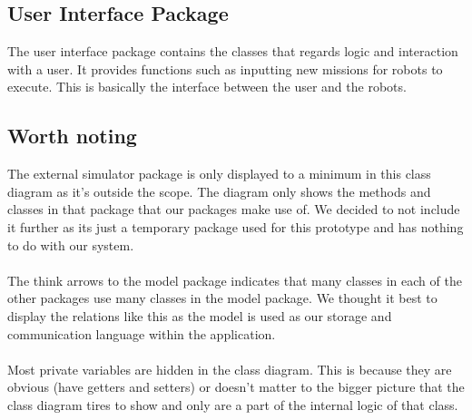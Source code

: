 \subsection{User Interface Package}
The user interface package contains the classes that regards logic and interaction with a user. It provides functions such as inputting new missions for robots to execute. This is basically the interface between the user and the robots.

\subsection{Worth noting}
The external simulator package is only displayed to a minimum in this class diagram as it's outside the scope. The diagram only shows the methods and classes in that package that our packages make use of. We decided to not include it further as its just a temporary package used for this prototype and has nothing to do with our system.
\\ \\
The think arrows to the model package indicates that many classes in each of the other packages use many classes in the model package. We thought it best to display the relations like this as the model is used as our storage and communication language within the application.
\\ \\
Most private variables are hidden in the class diagram. This is because they are obvious (have getters and setters) or doesn't matter to the bigger picture that the class diagram tires to show and only are a part of the internal logic of that class. 